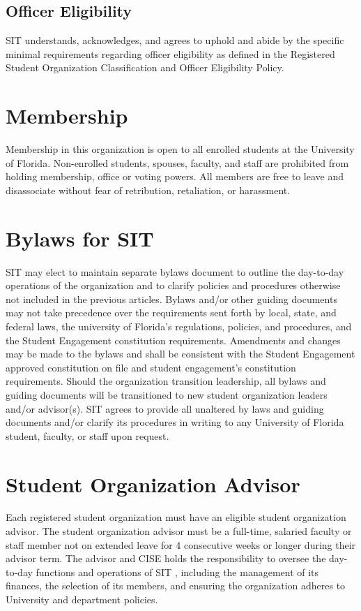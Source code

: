 \documentclass{article}
\def\clubname{SIT }
\begin{document}
\subsection{Officer Eligibility}
\clubname understands, acknowledges, and agrees to uphold and abide by the specific minimal requirements regarding officer eligibility as defined in the Registered Student Organization Classification and Officer Eligibility Policy.


\section{Membership}

Membership in this organization is open to all enrolled students at the University of Florida. Non-enrolled students, spouses, faculty, and staff are prohibited from holding membership, office or voting powers. All members are free to leave and disassociate without fear of retribution, retaliation, or harassment.


\section{Bylaws for \clubname}

\clubname may elect to maintain separate bylaws document to outline the day-to-day operations of the organization and to clarify policies and procedures otherwise not included in the previous articles. Bylaws and/or other guiding documents may not take precedence over the requirements sent forth by local, state, and federal laws, the university of Florida’s regulations, policies, and procedures, and the Student Engagement constitution requirements. Amendments and changes may be made to the bylaws and shall be consistent with the Student Engagement approved constitution on file and student engagement’s constitution requirements. Should the organization transition leadership, all bylaws and guiding documents will be transitioned to new student organization leaders and/or advisor(s). \clubname agrees to provide all unaltered by laws and guiding documents and/or clarify its procedures in writing to any University of Florida student, faculty, or staff upon request.


\section{Student Organization Advisor}
Each registered student organization must have an eligible student organization advisor. The student organization advisor must be a full-time, salaried faculty or staff member not on extended leave for 4 consecutive weeks or longer during their advisor term. The advisor and CISE holds the responsibility to oversee the day-to-day functions and operations of \clubname, including the management of its finances, the selection of its members, and ensuring the organization adheres to University and department policies.
\end{document}
